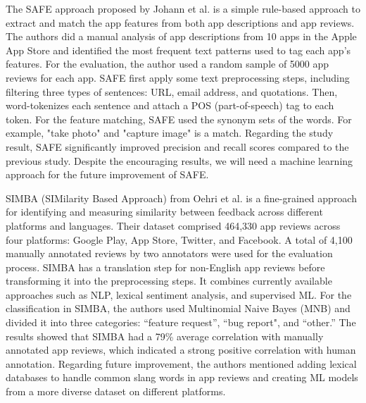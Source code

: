 \documentclass[12pt]{article}
\begin{document}
The SAFE approach proposed by Johann et al. \cite{safe_paper} is a simple rule-based approach to extract and match the app features from both app descriptions and app reviews. The authors did a manual analysis of app descriptions from 10 apps in the Apple App Store and identified the most frequent text patterns used to tag each app's features. For the evaluation, the author used a random sample of 5000 app reviews for each app. SAFE first apply some text preprocessing steps, including filtering three types of sentences: URL, email address, and quotations. Then, word-tokenizes each sentence and attach a POS (part-of-speech) tag to each token. For the feature matching, SAFE used the synonym sets of the words. For example, "take photo" and "capture image" is a match. Regarding the study result, SAFE significantly improved precision and recall scores compared to the previous study. Despite the encouraging results, we will need a machine learning approach for the future improvement of SAFE.

SIMBA (SIMilarity Based Approach) from Oehri et al. \cite{simba_paper} is a fine-grained approach for identifying and measuring similarity between feedback across different platforms and languages. Their dataset comprised 464,330 app reviews across four platforms: Google Play, App Store, Twitter, and Facebook. A total of 4,100 manually annotated reviews by two annotators were used for the evaluation process. SIMBA has a translation step for non-English app reviews before transforming it into the preprocessing steps. It combines currently available approaches such as NLP, lexical sentiment analysis, and supervised ML. For the classification in SIMBA, the authors used Multinomial Naive Bayes (MNB) and divided it into three categories: “feature request”, “bug report", and “other.” The results showed that SIMBA had a 79\% average correlation with manually annotated app reviews, which indicated a strong positive correlation with human annotation. Regarding future improvement, the authors mentioned adding lexical databases to handle common slang words in app reviews and creating ML models from a more diverse dataset on different platforms.
\end{document}
